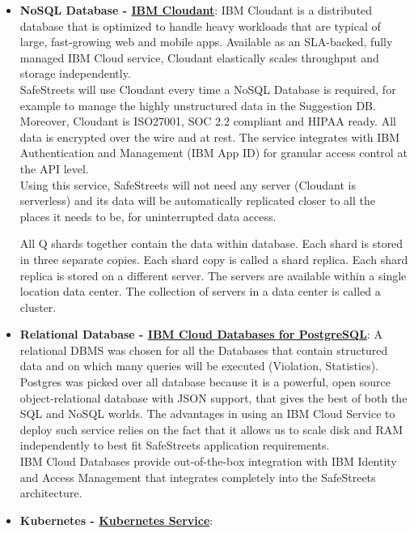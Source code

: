 \begin{itemize}
	\item \textbf{NoSQL Database - \href{https://cloud.ibm.com/catalog/services/cloudant}{IBM Cloudant}}: \hypertarget{cloudant}{} IBM Cloudant is a distributed database that is optimized to handle heavy workloads that are typical of large, fast-growing web and mobile apps. Available as an SLA-backed, fully managed IBM Cloud service, Cloudant elastically scales throughput and storage independently.
	\\SafeStreets will use Cloudant every time a NoSQL Database is required, for example to manage the highly unstructured data in the Suggestion DB.
	Moreover, Cloudant is ISO27001, SOC 2.2 compliant and HIPAA ready. All data is encrypted over the wire and at rest. The service integrates with IBM Authentication and Management (IBM App ID) for granular access control at the API level.
	\\Using this service, SafeStreets will not need any server (Cloudant is serverless) and its data will be automatically replicated closer to all the places it needs to be, for uninterrupted data access.

	All Q shards together contain the data within database. Each shard is stored in three separate copies. Each shard copy is called a shard replica. Each shard replica is stored on a different server. The servers are available within a single location data center. The collection of servers in a data center is called a cluster.
	
	\item \textbf{Relational Database - \href{https://cloud.ibm.com/catalog/services/databases-for-postgresql}{IBM Cloud Databases for PostgreSQL}}: \hypertarget{postgres}{} A relational DBMS was chosen for all the Databases that contain structured data and on which many queries will be executed (Violation, Statistics). Postgres was picked over all database because it is a powerful, open source object-relational database with JSON support, that gives the best of both the SQL and NoSQL worlds. The advantages in using an IBM Cloud Service to deploy such service relies on the fact that it allows us to scale disk and RAM independently to best fit SafeStreets application requirements.
	\\IBM Cloud Databases provide out-of-the-box integration with IBM Identity and Access Management that integrates completely into the SafeStreets architecture. 

	\item \textbf{Kubernetes - \href{https://cloud.ibm.com/kubernetes/catalog/cluster}{Kubernetes Service}}: \hypertarget{kubernetes}{}
\end{itemize}